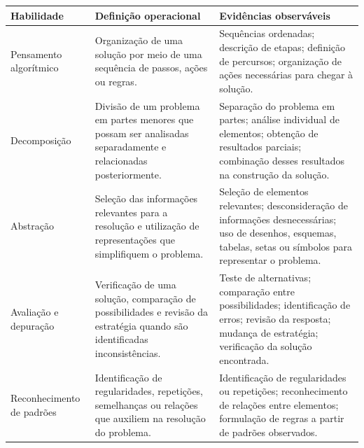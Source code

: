 \begin{quadro}[htbp]
    \centering

    \captionsetup{
        font=footnotesize,
        justification=raggedright,
        singlelinecheck=false
    }
    \caption{Habilidades de Pensamento Computacional e evidências observáveis na pesquisa}
    \label{quad:habilidades-pc}

    \footnotesize
    \renewcommand{\arraystretch}{1.2}

    \begin{tabularx}{\textwidth}{
        |>{\raggedright\arraybackslash}p{3.0cm}
        |>{\raggedright\arraybackslash}p{4.6cm}
        |>{\raggedright\arraybackslash}X|}
        \hline

        \textbf{Habilidade} &
        \textbf{Definição operacional} &
        \textbf{Evidências observáveis} \\
        \hline

        Pensamento algorítmico &
        Organização de uma solução por meio de uma sequência de passos, ações ou regras. &
        Sequências ordenadas; descrição de etapas; definição de percursos; organização de ações necessárias para chegar à solução. \\
        \hline

        Decomposição &
        Divisão de um problema em partes menores que possam ser analisadas separadamente e relacionadas posteriormente. &
        Separação do problema em partes; análise individual de elementos; obtenção de resultados parciais; combinação desses resultados na construção da solução. \\
        \hline

        Abstração &
        Seleção das informações relevantes para a resolução e utilização de representações que simplifiquem o problema. &
        Seleção de elementos relevantes; desconsideração de informações desnecessárias; uso de desenhos, esquemas, tabelas, setas ou símbolos para representar o problema. \\
        \hline

        Avaliação e depuração &
        Verificação de uma solução, comparação de possibilidades e revisão da estratégia quando são identificadas inconsistências. &
        Teste de alternativas; comparação entre possibilidades; identificação de erros; revisão da resposta; mudança de estratégia; verificação da solução encontrada. \\
        \hline

        Reconhecimento de padrões &
        Identificação de regularidades, repetições, semelhanças ou relações que auxiliem na resolução do problema. &
        Identificação de regularidades ou repetições; reconhecimento de relações entre elementos; formulação de regras a partir de padrões observados. \\
        \hline


\end{tabularx}
\end{quadro}
